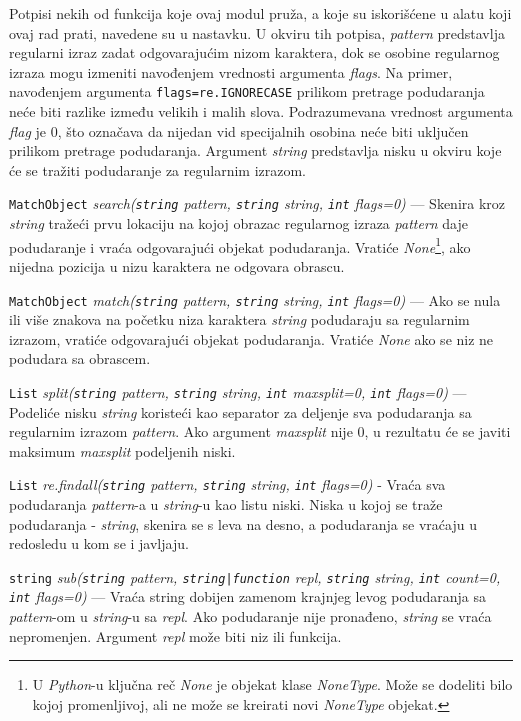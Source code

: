 \documentclass[12pt,oneside]{memoir}
\theoremstyle{plain}
\theoremstyle{definition}
\begin{document}

Potpisi nekih od funkcija koje ovaj modul pruža, a koje su iskorišćene u alatu koji ovaj rad prati, navedene su u nastavku. U okviru tih potpisa, \textit{pattern} predstavlja regularni izraz zadat odgovarajućim nizom karaktera, dok se osobine regularnog izraza mogu izmeniti navođenjem vrednosti argumenta \textit{flags}. Na primer, navođenjem argumenta \texttt{flags=re.IGNORECASE} prilikom pretrage podudaranja neće biti razlike između velikih i malih slova. Podrazumevana vrednost argumenta \textit{flag} je 0, što označava da nijedan vid specijalnih osobina neće biti uključen prilikom pretrage podudaranja. Argument \textit{string} predstavlja nisku u okviru koje će se tražiti podudaranje za regularnim izrazom.


\begin{description}
\item  \texttt{MatchObject} \textit{search(\texttt{string} pattern, \texttt{string} string, \texttt{int} flags=0)} --- Skenira kroz \textit{string} tražeći prvu lokaciju na kojoj obrazac regularnog izraza \textit{pattern} daje podudaranje i vraća odgovarajući objekat podudaranja. Vratiće \textit{None}\footnote{U \textit{Python}-u ključna reč \textit{None} je objekat klase \textit{NoneType}. Može se dodeliti bilo kojoj promenljivoj, ali ne može se kreirati novi \textit{NoneType} objekat.}, ako nijedna pozicija u nizu karaktera ne odgovara obrascu. 
\item  \texttt{MatchObject} \textit{match(\texttt{string} pattern, \texttt{string} string, \texttt{int} flags=0)} --- Ako se nula ili više znakova na početku niza karaktera \textit{string} podudaraju sa regularnim izrazom, vratiće odgovarajući objekat podudaranja. Vratiće \textit{None} ako se niz ne podudara sa obrascem.
\item  \texttt{List} \textit{split(\texttt{string} pattern, \texttt{string} string, \texttt{int} maxsplit=0, \texttt{int} flags=0)} --- Podeliće nisku \textit{string} koristeći kao separator za deljenje sva podudaranja sa regularnim izrazom \textit{pattern}. Ako argument \textit{maxsplit} nije 0, u rezultatu će se javiti maksimum \textit{maxsplit} podeljenih niski.  
\item  \texttt{List} \textit{re.findall(\texttt{string} pattern, \texttt{string} string, \texttt{int} flags=0)} - Vraća sva podudaranja \textit{pattern}-a u \textit{string}-u kao listu niski. Niska u kojoj se traže podudaranja - \textit{string}, skenira se s leva na desno, a podudaranja se vraćaju u redosledu u kom se i javljaju. 
\item  \texttt{string} \textit{sub(\texttt{string} pattern, \texttt{string|function} repl, \texttt{string} string, \texttt{int} count=0, \texttt{int} flags=0)} --- Vraća string dobijen zamenom krajnjeg levog podudaranja sa \textit{pattern}-om u \textit{string}-u sa \textit{repl}. Ako podudaranje nije pronađeno, \textit{string} se vraća nepromenjen. Argument \textit{repl} može biti niz ili funkcija.
\end{description}
\end{document}
